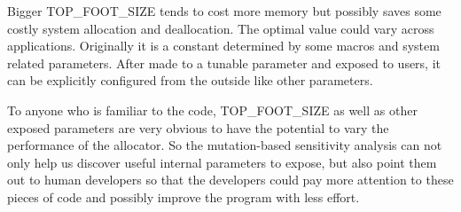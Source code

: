 Bigger TOP\_FOOT\_SIZE tends to cost more memory but possibly saves some costly system allocation and deallocation. The optimal value could vary across applications. Originally it is a constant determined by some macros and system related parameters. After made to a tunable parameter and exposed to users, it can be explicitly configured from the outside like other parameters.

To anyone who is familiar to the code, TOP\_FOOT\_SIZE as well as other exposed parameters are very obvious to have the potential to vary the performance of the allocator. So the mutation-based sensitivity analysis can not only help us discover useful internal parameters to expose, but also point them out to human developers so that the developers could pay more attention to these pieces of code and possibly improve the program with less effort.
